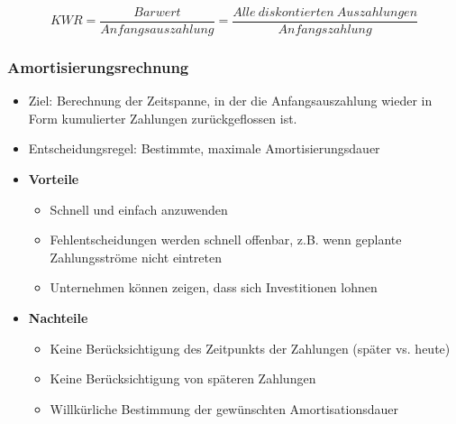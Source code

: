 \[KWR = \frac{Barwert}{Anfangsauszahlung} = \frac{Alle~diskontierten~Auszahlungen}{Anfangszahlung}\]

\subsubsection{Amortisierungsrechnung}
\begin{itemize}
	\item Ziel: Berechnung der Zeitspanne, in der die Anfangsauszahlung wieder in Form kumulierter Zahlungen zurückgeflossen ist.
	\item Entscheidungsregel: Bestimmte, maximale Amortisierungsdauer
	\item \textbf{Vorteile}
	\begin{itemize}
		\item Schnell und einfach anzuwenden
		\item Fehlentscheidungen werden schnell offenbar, z.B. wenn geplante Zahlungsströme nicht eintreten
		\item Unternehmen können zeigen, dass sich Investitionen lohnen
	\end{itemize}
	\item \textbf{Nachteile}
	\begin{itemize}
		\item Keine Berücksichtigung des Zeitpunkts der Zahlungen (später vs. heute)
		\item Keine Berücksichtigung von späteren Zahlungen
		\item Willkürliche Bestimmung der gewünschten Amortisationsdauer
	\end{itemize}
\end{itemize}

